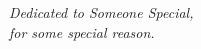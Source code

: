 \null \vfill
\begin{flushright}
{\em Dedicated to Someone Special,}\\
{\em for some special reason.}
\end{flushright}
\null \vfill

